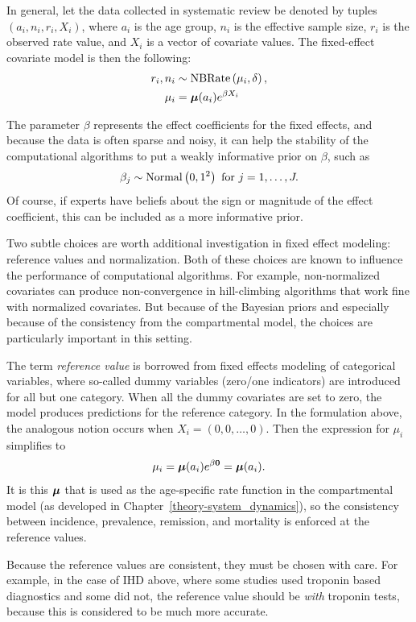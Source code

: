 In general, let the data collected in systematic review be denoted by
tuples $\left(a_i, n_i, r_i, X_i\right)$, where $a_i$ is the age
group, $n_i$ is the effective sample size, $r_i$ is the observed rate
value, and $X_i$ is a vector of covariate values. The fixed-effect
covariate model is then the following:
\begin{align*}
r_i, n_i &\sim \operatorname{NBRate}\left(\mu_i, \delta\right),\\
\mu_i &= \boldsymbol{\mu}(a_i)e^{\beta X_i}
\end{align*}

The parameter $\beta$ represents the effect coefficients for
the fixed effects, and because the data is often sparse and noisy, it
can help the stability of the computational algorithms to put a weakly
informative prior on $\beta$, such as
\[
\beta_j \sim \operatorname{Normal}\left(0, 1^2\right) \text{ for } j = 1, \ldots, J.
\]
Of course, if experts have beliefs about the sign or magnitude of the
effect coefficient, this can be included as a more informative prior.

Two subtle choices are worth additional investigation in fixed effect
modeling: reference values and normalization.  Both of these choices
are known to influence the performance of computational
algorithms. For example, non-normalized covariates can produce
non-convergence in hill-climbing algorithms that work fine with
normalized covariates.  But because of the Bayesian priors and
especially because of the consistency from the compartmental model,
the choices are particularly important in this setting.

The term \emph{reference value} is borrowed from fixed effects
modeling of categorical variables, where so-called dummy variables
(zero/one indicators) are introduced for all but one category. When
all the dummy covariates are set to zero, the model produces
predictions for the reference category. In the formulation above, the
analogous notion occurs when $X_i = (0, 0, \ldots, 0)$.  Then the
expression for $\mu_i$ simplifies to
\[
\mu_i = \boldsymbol{\mu}(a_i) e^{\beta \mathbf{0}} = \boldsymbol{\mu}(a_i).
\]
It is this $\boldsymbol{\mu}$ that is used as the age-specific rate function in
the compartmental model (as developed in
Chapter~\ref{theory-system_dynamics}), so the consistency between
incidence, prevalence, remission, and mortality is enforced at the
reference values.

Because the reference values are consistent, they must be chosen with
care.  For example, in the case of IHD above, where some studies used
troponin based diagnostics and some did not, the reference value
should be \emph{with} troponin tests, because this is considered to be
much more accurate.

